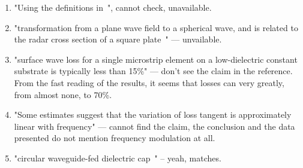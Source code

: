\documentclass{article}
\begin{document}
\begin{enumerate}
        \item "Using the definitions in~\cite{balanis_1982}",  cannot check, unavailable.
        \item "transformation from a plane wave field to a spherical wave, and is related to the radar cross section of a square plate~\cite{knott.etal_2004}" --- unvailable.
        \item "surface wave loss for a single microstrip element on a low-dielectric constant substrate is typically less than 15\%"\cite{pozar_1985oct} --- don't see the claim in the reference.
        From the fast reading of the results, it seems that losses can very greatly, from almost none, to 70\%.
        \item "Some estimates suggest that the variation of loss tangent is approximately linear with frequency\cite{levine.etal_1989apr}" --- cannot find the claim, the conclusion and the data presented do not mention frequency modulation at all.
        \item "circular waveguide-fed dielectric cap~\cite{syrigos_1987jun}" -- yeah, matches.
    \end{enumerate}
    
    
\end{document}
